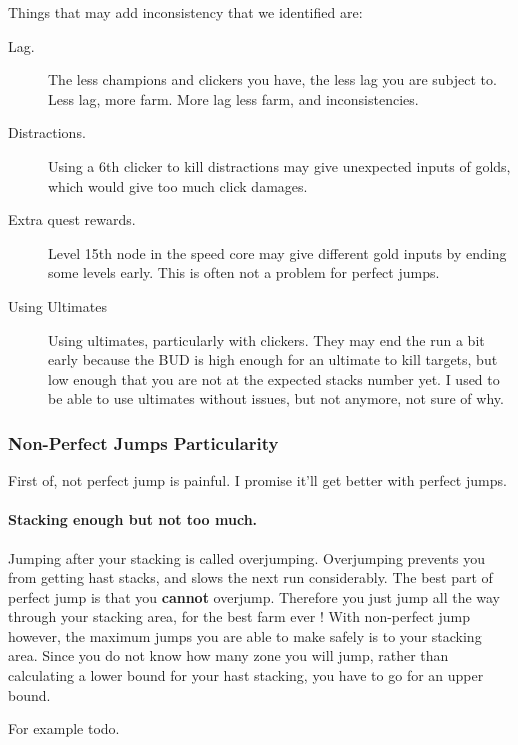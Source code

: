 \documentclass{article}
\begin{document}
Things that may add inconsistency that we identified are:
\begin{description}
    \item[Lag.]
    The less champions and clickers you have, the less lag you are subject to.
    Less lag, more farm.
    More lag less farm, and inconsistencies.
    
    \item[Distractions.] Using a 6th clicker to kill distractions may give unexpected inputs of golds, which would give too much click damages.
    
    \item[Extra quest rewards.] Level 15th node in the speed core may give different gold inputs by ending some levels early.
    This is often not a problem for perfect jumps.
    
    \item[Using Ultimates] Using ultimates, particularly with clickers.
    They may end the run a bit early because the BUD is high enough for an ultimate to kill targets, but low enough that you are not at the expected stacks number yet.
    I used to be able to use ultimates without issues, but not anymore, not sure of why.
\end{description}


\subsubsection{Non-Perfect Jumps Particularity}
\label{sec:nonPerfectJumps}

First of, not perfect jump is painful.\newline
I promise it'll get better with perfect jumps.

\paragraph{Stacking enough but not too much.}
Jumping after your stacking is called overjumping.
Overjumping prevents you from getting hast stacks, and slows the next run considerably.
The best part of perfect jump is that you \textbf{cannot} overjump.
Therefore you just jump all the way through your stacking area, for the best farm ever !
With non-perfect jump however, the maximum jumps you are able to make safely is to your stacking area.
Since you do not know how many zone you will jump, rather than calculating a lower bound for your hast stacking, you have to go for an upper bound.

For example todo.
\end{document}
